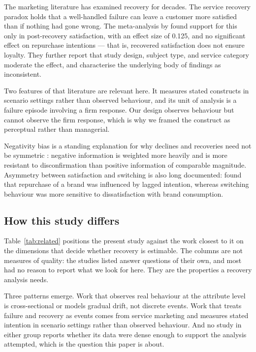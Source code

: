 \documentclass[11pt,a4paper]{article}
\makeatletter
\let\original@subsection\subsection
\renewcommand{\subsection}{\FloatBarrier\original@subsection}%
\makeatother
\begin{document}
The marketing literature has examined recovery for decades. The service
recovery paradox holds that a well-handled failure can leave a customer more
satisfied than if nothing had gone wrong. The meta-analysis by
\citet{dematos2007} found support for this only in post-recovery satisfaction,
with an effect size of 0.125, and no significant effect on repurchase
intentions --- that is, recovered satisfaction does not ensure loyalty. They
further report that study design, subject type, and service category moderate
the effect, and characterise the underlying body of findings as inconsistent.

Two features of that literature are relevant here. It measures stated
constructs in scenario settings rather than observed behaviour, and its unit
of analysis is a failure episode involving a firm response. Our design
observes behaviour but cannot observe the firm response, which is why we
framed the construct as perceptual rather than managerial.

Negativity bias is a standing explanation for why declines and recoveries need
not be symmetric \citep{baumeister2001, rozin2001}: negative information is
weighted more heavily and is more resistant to disconfirmation than positive
information of comparable magnitude. Asymmetry between satisfaction and
switching is also long documented:
\citet{labarbera1983} found that repurchase of a brand was influenced by
lagged intention, whereas switching behaviour was more sensitive to
dissatisfaction with brand consumption.

\subsection{How this study differs}
\label{sec:comparison}

Table~\ref{tab:related} positions the present study against the work closest to
it on the dimensions that decide whether recovery is estimable. The columns are
not measures of quality: the studies listed answer questions of their own, and
most had no reason to report what we look for here. They are the properties a
recovery analysis needs.

Three patterns emerge. Work that observes real behaviour at the attribute level
is cross-sectional or models gradual drift, not discrete events. Work that
treats failure and recovery as events comes from service marketing and measures
stated intention in scenario settings rather than observed behaviour. And no
study in either group reports whether its data were dense enough to support the
analysis attempted, which is the question this paper is about.
\end{document}
